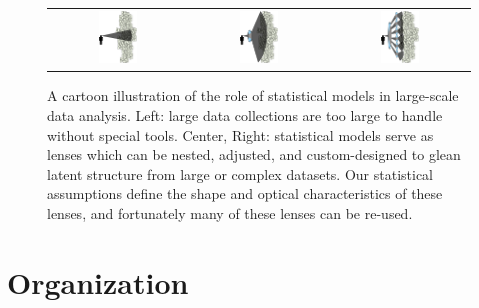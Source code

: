 \begin{figure}
  \center
  \begin{tabular}{ccc}
    \includegraphics[width=0.3\textwidth,height=0.3\textwidth]{chapter_introduction/figures/person_data.pdf} &
    \includegraphics[width=0.3\textwidth,height=0.3\textwidth]{chapter_introduction/figures/person_data_lens.pdf} &
    \includegraphics[width=0.3\textwidth,height=0.3\textwidth]{chapter_introduction/figures/person_data_lens2.pdf} \\
  \end{tabular}
  \caption{A cartoon illustration of the role of statistical models in
    large-scale data analysis.  Left: large data collections are too
    large to handle without special tools. Center, Right: statistical
    models serve as lenses which can be nested, adjusted, and
    custom-designed to glean latent structure from large or complex
    datasets.  Our statistical assumptions define the shape and
    optical characteristics of these lenses, and fortunately many of
    these lenses can be re-used.}
  \label{fig:person_data_lens}
\end{figure}


\section*{Organization}

